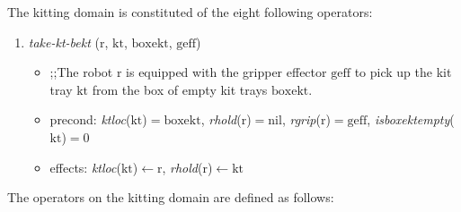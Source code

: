 The kitting domain is constituted of the eight following operators:
\begin{enumerate}
\item \textsl{take-kt-bekt} ($\mathrm{r}$, $\mathrm{kt}$, $\mathrm{boxekt}$, $\mathrm{geff}$)
\begin{itemize}
\item ;;The robot $\mathrm{r}$ is equipped with the gripper effector $\mathrm{geff}$ to pick up the kit tray $\mathrm{kt}$ from the box of empty kit trays $\mathrm{boxekt}$.
\item precond: \emph{ktloc}($\mathrm{kt}$)$\mathrm{= boxekt}$, \emph{rhold}($\mathrm{r}$)$\mathrm{= nil}$, \emph{rgrip}($\mathrm{r}$)$\mathrm{= geff}$, \emph{isboxektempty}($\mathrm{kt}$)$= 0$
\item effects: \emph{ktloc}($\mathrm{kt}$)$\leftarrow$$\mathrm{r}$, \emph{rhold}($\mathrm{r}$)$\leftarrow$$\mathrm{kt}$
\end{itemize}
\end{enumerate}
The operators on the kitting domain are defined as follows:
